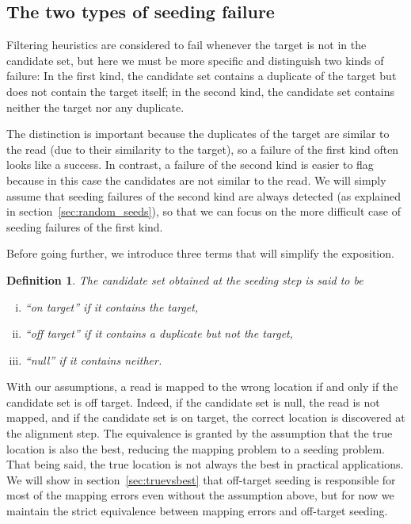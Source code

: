 \documentclass{article}
\newtheorem{definition}{Definition}
\begin{document}
\subsection{The two types of seeding failure}
\label{sec:twotypes}

Filtering heuristics are considered to fail whenever the target is not in
the candidate set, but here we must be more specific and distinguish two
kinds of failure: In the first kind, the candidate set contains a
duplicate of the target but does not contain the target itself; in the
second kind, the candidate set contains neither the target nor any
duplicate.

The distinction is important because the duplicates of the target are
similar to the read (due to their similarity to the target), so a failure
of the first kind often looks like a success. In contrast, a failure of
the second kind is easier to flag because in this case the candidates are
not similar to the read. We will simply assume that seeding failures of
the second kind are always detected (as explained in
section~\ref{sec:random_seeds}), so that we can focus on the more
difficult case of seeding failures of the first kind.

Before going further, we introduce three terms that will simplify the
exposition.

\begin{definition}
The candidate set obtained at the seeding step is said to be
\begin{enumerate}[i)]
\item ``on target'' if it contains the target,
\item ``off target'' if it contains a duplicate but not the target, 
\item ``null'' if it contains neither.
\end{enumerate}
\end{definition}

With our assumptions, a read is mapped to the wrong location if and only
if the candidate set is off target. Indeed, if the candidate set is null,
the read is not mapped, and if the candidate set is on target, the correct
location is discovered at the alignment step. The equivalence is granted
by the assumption that the true location is also the best, reducing the
mapping problem to a seeding problem. That being said, the true location
is not always the best in practical applications. We will show in
section~\ref{sec:truevsbest} that off-target seeding is responsible for
most of the mapping errors even without the assumption above, but for now
we maintain the strict equivalence between mapping errors and off-target
seeding.
\end{document}

